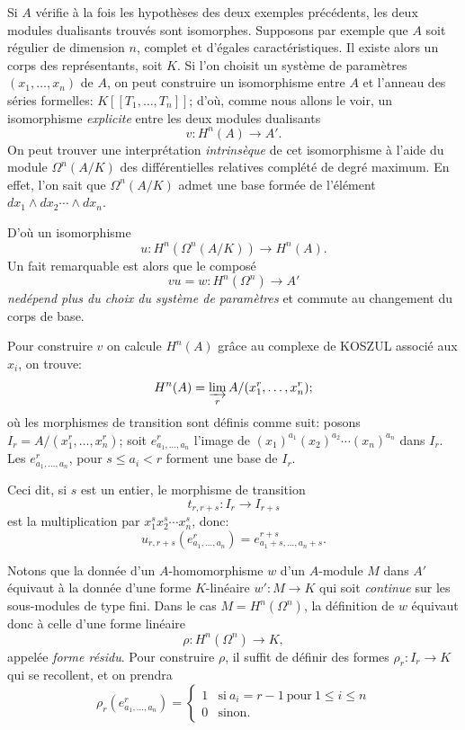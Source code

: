 \begin{remarque} \label{IV.5.5}
Si $A$ v\'erifie \`a la fois les hypoth\`eses des deux exemples pr\'ec\'edents, les deux modules dualisants trouv\'es sont isomorphes. Supposons par exemple que $A$ soit r\'egulier de dimension $n$, complet et d'\'egales caract\'eristiques. Il existe alors un corps des repr\'esentants, soit $K$. Si l'on choisit un syst\`eme de param\`etres $(x_{1}, \ldots, x_{n})$ de $A$, on peut construire un isomorphisme entre $A$ et l'anneau des s\'eries formelles: $K[[T_{1}, \ldots, T_{n}]]$; d'o\`u, comme nous allons le voir, un isomorphisme \emph{explicite} entre les deux modules dualisants
$$
v\colon H^{n}(A)\to A'.
$$
On peut trouver une interpr\'etation \emph{intrins\`eque} de cet isomorphisme \`a l'aide du module $\Omega^{n}(A/K)$ des diff\'erentielles relatives compl\'et\'e de degr\'e maximum. En effet, l'on sait que $\Omega^{n}(A/K)$ admet une base form\'ee de l'\'el\'ement $dx_{1}\wedge dx_{2}\cdots \wedge dx_{n}$.

D'o\`u un isomorphisme
$$
u\colon H^{n}(\Omega^{n}(A/K))\to H^{n}(A).
$$
Un fait remarquable est alors que le compos\'e
$$
vu=w\colon H^{n}(\Omega^{n})\to A'
$$
\emph{ne\pageoriginaled d\'epend plus du choix du syst\`eme de param\`etres} et commute au changement du corps de base.

Pour construire $v$ on calcule $H^{n}(A)$ gr\^ace au complexe de KOSZUL associ\'e aux $x_{i}$, on trouve:
$$
H^{n}(A)=\varinjlim_{r}A/(x_{1}^{r}, \ldots, x_{n}^{r});
$$
o\`u les morphismes de transition sont d\'efinis comme suit: posons $I_{r}=A/(x_{1}^{r}, \ldots, x_{n}^{r})$; soit $e_{a_{1}, \ldots, a_{n}}^{r}$ l'image de $(x_{1})^{a_{1}}(x_{2})^{a_{2}}\cdots (x_{n})^{a_{n}}$ dans $I_{r}$. Les $e_{a_{1}, \ldots, a_{n}}^{r}$, pour $s\leq a_{i}<r$ forment une base de $I_{r}$.

Ceci dit, si $s$ est un entier, le morphisme de transition
$$
t_{r, r+s}\colon I_{r}\to I_{r+s}
$$
est la multiplication par $x_{1}^{s}x_{2}^{s}\cdots x_{n}^{s}$, donc:
$$
u_{r, r+s}(e_{a_{1}, \ldots, a_{n}}^{r})=e_{a_{1}+s, \ldots, a_{n}+s}^{r+s}.
$$

Notons que la donn\'ee d'un $A$-homomorphisme $w$ d'un $A$-module $M$ dans $A'$ \'equivaut \`a la donn\'ee d'une forme $K$-lin\'eaire $w':M\to K$ qui soit \emph{continue} sur les sous-modules de type fini. Dans le cas $M=H^{n}(\Omega^{n})$, la d\'efinition de $w$ \'equivaut donc \`a celle d'une forme lin\'eaire
$$
\rho \colon H^{n}(\Omega^{n})\to K,
$$
appel\'ee \emph{forme r\'esidu}\label{pagecithar}. Pour construire $\rho$, il suffit de d\'efinir des formes $\rho_{r}:I_{r}\to K$ qui se recollent, et on prendra
$$
\rho_{r}(e_{a_{1}, \ldots, a_{n}}^{r})=
\begin{cases}
1&\text{si}\ a_{i}=r-1\ \text{pour}\ 1\leq i\leq n\\
0& \text{sinon.}
\end{cases}
$$
\end{remarque}


